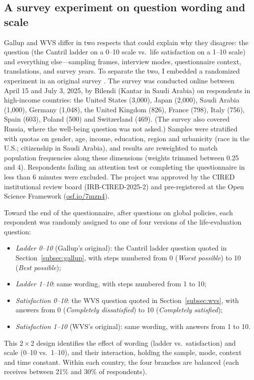 \subsection{A survey experiment on question wording and scale}\label{subsec:fabre}

Gallup and WVS differ in two respects that could explain why they disagree: the question (the Cantril ladder on a 0--10 scale vs.\ life satisfaction on a 1--10 scale) and everything else---sampling frames, interview modes, questionnaire context, translations, and survey years. To separate the two, I embedded a randomized experiment in an original survey \citep{fabre_public_2025}. The survey was conducted online between April 15 and July 3, 2025, by Bilendi (Kantar in Saudi Arabia) on \nFabre respondents in \nFabreCountries high-income countries: the United States (3,000), Japan (2,000), Saudi Arabia (1,000), Germany (1,048), the United Kingdom (826), France (798), Italy (756), Spain (603), Poland (500) and Switzerland (469). (The survey also covered Russia, where the well-being question was not asked.) Samples were stratified with quotas on gender, age, income, education, region and urbanicity (race in the U.S.; citizenship in Saudi Arabia), and results are reweighted to match population frequencies along these dimensions (weights trimmed between 0.25 and 4). Respondents failing an attention test or completing the questionnaire in less than 6 minutes were excluded. The project was approved by the CIRED institutional review board (IRB-CIRED-2025-2) and pre-registered at the Open Science Framework (\href{https://osf.io/7mzn4}{osf.io/7mzn4}).

Toward the end of the questionnaire, after questions on global policies, each respondent was randomly assigned to one of four versions of the life-evaluation question:
\begin{itemize}
    \item \textit{Ladder 0--10} (Gallup's original): the Cantril ladder question quoted in Section~\ref{subsec:gallup}, with steps numbered from 0 (\textit{Worst possible}) to 10 (\textit{Best possible});
    \item \textit{Ladder 1--10}: same wording, with steps numbered from 1 to 10;
    \item \textit{Satisfaction 0--10}: the WVS question quoted in Section~\ref{subsec:wvs}, with answers from 0 (\textit{Completely dissatisfied}) to 10 (\textit{Completely satisfied});
    \item \textit{Satisfaction 1--10} (WVS's original): same wording, with answers from 1 to 10.
\end{itemize}
This $2 \times 2$ design identifies the effect of wording (ladder vs.\ satisfaction) and scale (0--10 vs.\ 1--10), and their interaction, holding the sample, mode, context and time constant. Within each country, the four branches are balanced (each receives between 21\% and 30\% of respondents).
